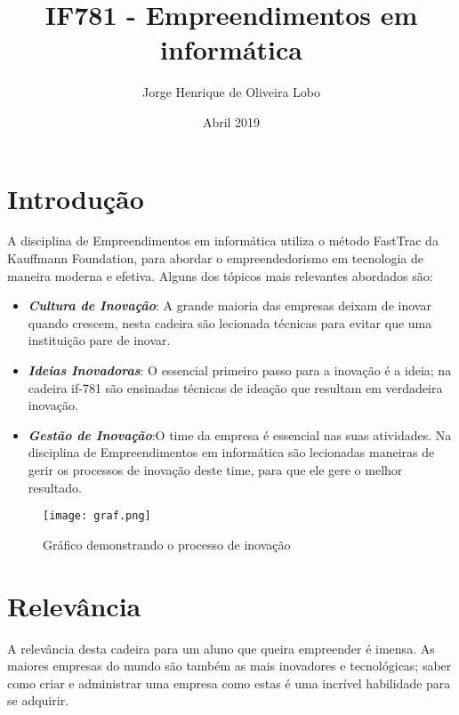\documentclass[10pt]{article}
\title{IF781 - Empreendimentos em informática}
\author{Jorge Henrique de Oliveira Lobo}
\date{Abril 2019}
\begin{document}
\maketitle

\section{Introdução}

\noindent A disciplina de Empreendimentos em informática utiliza o método FastTrac da Kauffmann Foundation\citep{if781}, para abordar o empreendedorismo em tecnologia de maneira moderna e efetiva. Alguns dos tópicos mais  relevantes abordados são:

\begin{itemize}
\item \textbf{\textit{Cultura de Inovação}}: A grande maioria das empresas deixam de inovar quando crescem, nesta cadeira são lecionada técnicas para evitar que uma instituição pare de inovar.\citep{cult}
\end{itemize}
\begin{itemize}
\item \textbf{\textit{Ideias Inovadoras}}: O essencial primeiro passo para a inovação é a ideia; na cadeira if-781 são ensinadas técnicas de ideação que resultam em verdadeira inovação.\citep{inov} 
\end{itemize}
\begin{itemize}
\item \textbf{\textit{Gestão de Inovação}}:O time da empresa é essencial nas suas atividades. Na disciplina de Empreendimentos em informática são lecionadas maneiras de gerir os processos de inovação deste time, para que ele gere o melhor resultado.\citep{gest} 
\end{itemize}

\begin{figure}[h!]
\centering
\texttt{[image: graf.png]}
\caption{Gráfico demonstrando o processo de inovação \citep{graf}}
\label{fig:graf}
\end{figure}

\section{Relevância}

\noindent A relevância desta cadeira para um aluno que queira empreender é imensa. As maiores empresas do mundo são também as mais inovadores e tecnológicas; saber como criar e administrar uma empresa como estas é uma incrível habilidade para se adquirir.
\end{document}
